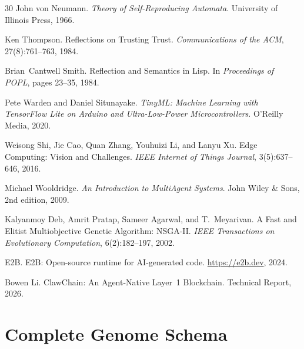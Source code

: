 \documentclass{article}
\begin{document}
\begin{thebibliography}{30}
John von Neumann.
\newblock \textit{Theory of Self-Reproducing Automata}.
\newblock University of Illinois Press, 1966.

Ken Thompson.
\newblock Reflections on Trusting Trust.
\newblock \textit{Communications of the ACM}, 27(8):761--763, 1984.

Brian~Cantwell Smith.
\newblock Reflection and Semantics in {Lisp}.
\newblock In \textit{Proceedings of POPL}, pages 23--35, 1984.

Pete Warden and Daniel Situnayake.
\newblock \textit{TinyML: Machine Learning with TensorFlow Lite on Arduino and Ultra-Low-Power Microcontrollers}.
\newblock O'Reilly Media, 2020.

Weisong Shi, Jie Cao, Quan Zhang, Youhuizi Li, and Lanyu Xu.
\newblock Edge Computing: Vision and Challenges.
\newblock \textit{IEEE Internet of Things Journal}, 3(5):637--646, 2016.

Michael Wooldridge.
\newblock \textit{An Introduction to MultiAgent Systems}.
\newblock John Wiley \& Sons, 2nd edition, 2009.

Kalyanmoy Deb, Amrit Pratap, Sameer Agarwal, and T.~Meyarivan.
\newblock A Fast and Elitist Multiobjective Genetic Algorithm: {NSGA-II}.
\newblock \textit{IEEE Transactions on Evolutionary Computation}, 6(2):182--197, 2002.

E2B.
\newblock E2B: Open-source runtime for AI-generated code.
\newblock \url{https://e2b.dev}, 2024.

Bowen Li.
\newblock ClawChain: An Agent-Native Layer~1 Blockchain.
\newblock Technical Report, 2026.

\end{thebibliography}



\appendix

\section{Complete Genome Schema}
\label{app:schema}
\end{document}
